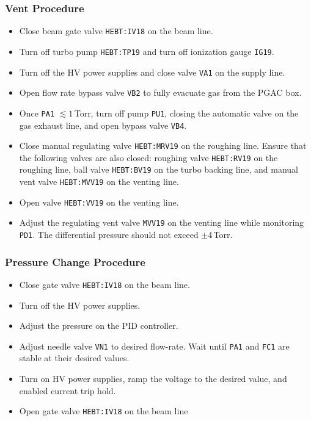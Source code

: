 \subsubsection{Vent Procedure}
\begin{itemize}
\setlength{\itemsep}{0pt}
\setlength{\parskip}{0pt}
\setlength{\parsep}{0pt}
\item Close beam gate valve \texttt{HEBT:IV18} on the beam line.
\item Turn off turbo pump \texttt{HEBT:TP19}  and turn off ionization gauge \texttt{IG19}.
\item Turn off the HV power supplies and close valve \texttt{VA1} on the supply line.
\item Open flow rate bypass valve \texttt{VB2} to fully evacuate gas from the PGAC box.
\item Once \texttt{PA1} $\lesssim 1$\,Torr, turn off pump \texttt{PU1}, closing the automatic valve on the gas exhaust line, and open bypass valve \texttt{VB4}.
\item Close manual regulating valve \texttt{HEBT:MRV19} on the roughing line.   Ensure that the following valves are also closed: roughing valve \texttt{HEBT:RV19} on the roughing line, ball valve \texttt{HEBT:BV19} on the turbo backing line, and manual vent valve \texttt{HEBT:MVV19} on the venting line.
\item Open valve \texttt{HEBT:VV19} on the venting line.
\item Adjust the regulating vent valve \texttt{MVV19} on the venting line while monitoring \texttt{PD1}.  The differential pressure should not exceed $\pm$4\,Torr.
\end{itemize}
\subsubsection{Pressure Change Procedure}
\begin{itemize}
\setlength{\itemsep}{0pt}
\setlength{\parskip}{0pt}
\setlength{\parsep}{0pt}
\item Close gate valve \texttt{HEBT:IV18} on the beam line.
\item Turn off the HV power supplies.
\item Adjust the pressure on the PID controller.
\item Adjust needle valve \texttt{VN1} to desired flow-rate.  Wait until \texttt{PA1} and \texttt{FC1} are stable at their desired values.
\item Turn on HV power supplies, ramp the voltage to the desired value, and enabled current trip hold.
\item Open gate valve \texttt{HEBT:IV18} on the beam line
\end{itemize}
